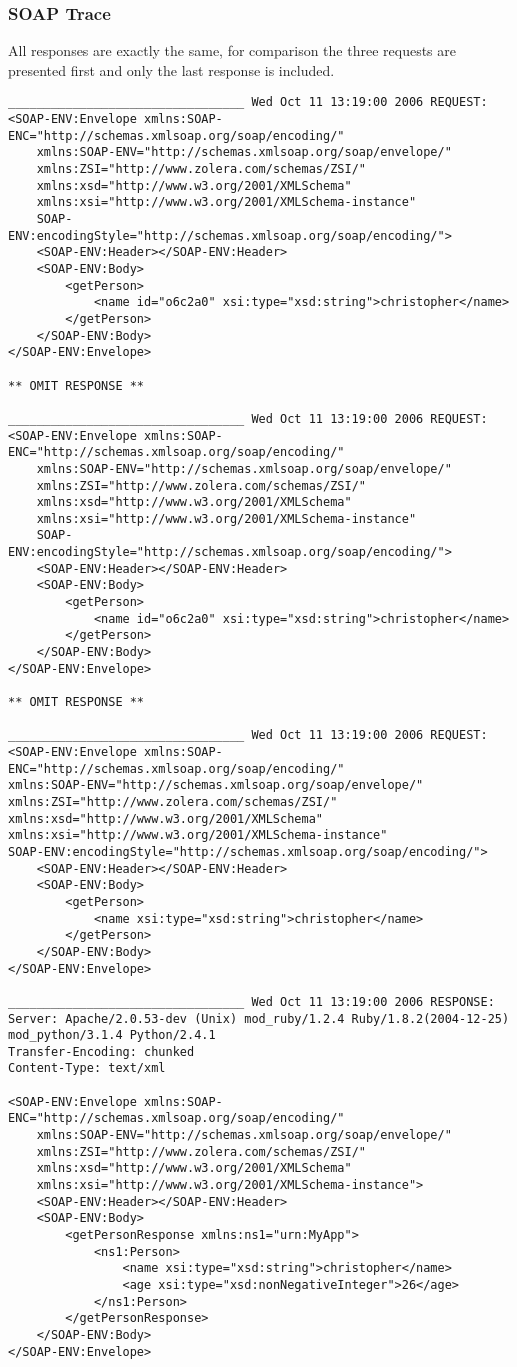 \subsubsection{SOAP Trace} All responses are exactly the same, for comparison
the three requests are presented first and only the last response is included.
\begin{verbatim}
_________________________________ Wed Oct 11 13:19:00 2006 REQUEST:
<SOAP-ENV:Envelope xmlns:SOAP-ENC="http://schemas.xmlsoap.org/soap/encoding/" 
	xmlns:SOAP-ENV="http://schemas.xmlsoap.org/soap/envelope/" 
	xmlns:ZSI="http://www.zolera.com/schemas/ZSI/" 
	xmlns:xsd="http://www.w3.org/2001/XMLSchema" 
	xmlns:xsi="http://www.w3.org/2001/XMLSchema-instance" 
	SOAP-ENV:encodingStyle="http://schemas.xmlsoap.org/soap/encoding/">
	<SOAP-ENV:Header></SOAP-ENV:Header>
	<SOAP-ENV:Body>
		<getPerson>
			<name id="o6c2a0" xsi:type="xsd:string">christopher</name>
		</getPerson>
	</SOAP-ENV:Body>
</SOAP-ENV:Envelope>

** OMIT RESPONSE **

_________________________________ Wed Oct 11 13:19:00 2006 REQUEST:
<SOAP-ENV:Envelope xmlns:SOAP-ENC="http://schemas.xmlsoap.org/soap/encoding/" 
	xmlns:SOAP-ENV="http://schemas.xmlsoap.org/soap/envelope/" 
	xmlns:ZSI="http://www.zolera.com/schemas/ZSI/" 
	xmlns:xsd="http://www.w3.org/2001/XMLSchema" 
	xmlns:xsi="http://www.w3.org/2001/XMLSchema-instance" 
	SOAP-ENV:encodingStyle="http://schemas.xmlsoap.org/soap/encoding/">
	<SOAP-ENV:Header></SOAP-ENV:Header>
	<SOAP-ENV:Body>
		<getPerson>
			<name id="o6c2a0" xsi:type="xsd:string">christopher</name>
		</getPerson>
	</SOAP-ENV:Body>
</SOAP-ENV:Envelope>

** OMIT RESPONSE **

_________________________________ Wed Oct 11 13:19:00 2006 REQUEST:
<SOAP-ENV:Envelope xmlns:SOAP-ENC="http://schemas.xmlsoap.org/soap/encoding/" 
xmlns:SOAP-ENV="http://schemas.xmlsoap.org/soap/envelope/" 
xmlns:ZSI="http://www.zolera.com/schemas/ZSI/" 
xmlns:xsd="http://www.w3.org/2001/XMLSchema" 
xmlns:xsi="http://www.w3.org/2001/XMLSchema-instance" 
SOAP-ENV:encodingStyle="http://schemas.xmlsoap.org/soap/encoding/">
	<SOAP-ENV:Header></SOAP-ENV:Header>
	<SOAP-ENV:Body>
		<getPerson>
			<name xsi:type="xsd:string">christopher</name>
		</getPerson>
	</SOAP-ENV:Body>
</SOAP-ENV:Envelope>

_________________________________ Wed Oct 11 13:19:00 2006 RESPONSE:
Server: Apache/2.0.53-dev (Unix) mod_ruby/1.2.4 Ruby/1.8.2(2004-12-25) 
mod_python/3.1.4 Python/2.4.1
Transfer-Encoding: chunked
Content-Type: text/xml

<SOAP-ENV:Envelope xmlns:SOAP-ENC="http://schemas.xmlsoap.org/soap/encoding/" 
	xmlns:SOAP-ENV="http://schemas.xmlsoap.org/soap/envelope/" 
	xmlns:ZSI="http://www.zolera.com/schemas/ZSI/" 
	xmlns:xsd="http://www.w3.org/2001/XMLSchema" 
	xmlns:xsi="http://www.w3.org/2001/XMLSchema-instance">
	<SOAP-ENV:Header></SOAP-ENV:Header>
	<SOAP-ENV:Body>
		<getPersonResponse xmlns:ns1="urn:MyApp">
			<ns1:Person>
				<name xsi:type="xsd:string">christopher</name>
				<age xsi:type="xsd:nonNegativeInteger">26</age>
			</ns1:Person>
		</getPersonResponse>
	</SOAP-ENV:Body>
</SOAP-ENV:Envelope>
\end{verbatim} 

